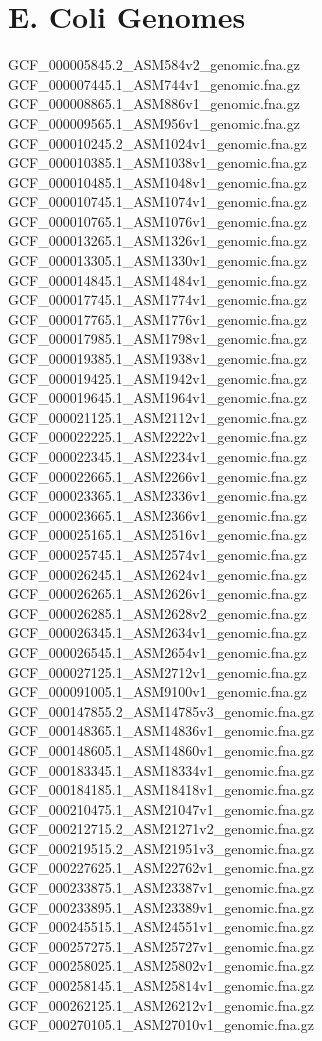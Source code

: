 \documentclass[12pt, letterpaper]{article}
\begin{document}
\clearpage
\appendix

\section{E. Coli Genomes}
\begin{verbatim*}
GCF_000005845.2_ASM584v2_genomic.fna.gz
GCF_000007445.1_ASM744v1_genomic.fna.gz
GCF_000008865.1_ASM886v1_genomic.fna.gz
GCF_000009565.1_ASM956v1_genomic.fna.gz
GCF_000010245.2_ASM1024v1_genomic.fna.gz
GCF_000010385.1_ASM1038v1_genomic.fna.gz
GCF_000010485.1_ASM1048v1_genomic.fna.gz
GCF_000010745.1_ASM1074v1_genomic.fna.gz
GCF_000010765.1_ASM1076v1_genomic.fna.gz
GCF_000013265.1_ASM1326v1_genomic.fna.gz
GCF_000013305.1_ASM1330v1_genomic.fna.gz
GCF_000014845.1_ASM1484v1_genomic.fna.gz
GCF_000017745.1_ASM1774v1_genomic.fna.gz
GCF_000017765.1_ASM1776v1_genomic.fna.gz
GCF_000017985.1_ASM1798v1_genomic.fna.gz
GCF_000019385.1_ASM1938v1_genomic.fna.gz
GCF_000019425.1_ASM1942v1_genomic.fna.gz
GCF_000019645.1_ASM1964v1_genomic.fna.gz
GCF_000021125.1_ASM2112v1_genomic.fna.gz
GCF_000022225.1_ASM2222v1_genomic.fna.gz
GCF_000022345.1_ASM2234v1_genomic.fna.gz
GCF_000022665.1_ASM2266v1_genomic.fna.gz
GCF_000023365.1_ASM2336v1_genomic.fna.gz
GCF_000023665.1_ASM2366v1_genomic.fna.gz
GCF_000025165.1_ASM2516v1_genomic.fna.gz
GCF_000025745.1_ASM2574v1_genomic.fna.gz
GCF_000026245.1_ASM2624v1_genomic.fna.gz
GCF_000026265.1_ASM2626v1_genomic.fna.gz
GCF_000026285.1_ASM2628v2_genomic.fna.gz
GCF_000026345.1_ASM2634v1_genomic.fna.gz
GCF_000026545.1_ASM2654v1_genomic.fna.gz
GCF_000027125.1_ASM2712v1_genomic.fna.gz
GCF_000091005.1_ASM9100v1_genomic.fna.gz
GCF_000147855.2_ASM14785v3_genomic.fna.gz
GCF_000148365.1_ASM14836v1_genomic.fna.gz
GCF_000148605.1_ASM14860v1_genomic.fna.gz
GCF_000183345.1_ASM18334v1_genomic.fna.gz
GCF_000184185.1_ASM18418v1_genomic.fna.gz
GCF_000210475.1_ASM21047v1_genomic.fna.gz
GCF_000212715.2_ASM21271v2_genomic.fna.gz
GCF_000219515.2_ASM21951v3_genomic.fna.gz
GCF_000227625.1_ASM22762v1_genomic.fna.gz
GCF_000233875.1_ASM23387v1_genomic.fna.gz
GCF_000233895.1_ASM23389v1_genomic.fna.gz
GCF_000245515.1_ASM24551v1_genomic.fna.gz
GCF_000257275.1_ASM25727v1_genomic.fna.gz
GCF_000258025.1_ASM25802v1_genomic.fna.gz
GCF_000258145.1_ASM25814v1_genomic.fna.gz
GCF_000262125.1_ASM26212v1_genomic.fna.gz
GCF_000270105.1_ASM27010v1_genomic.fna.gz

\end{verbatim*}
\end{document}
